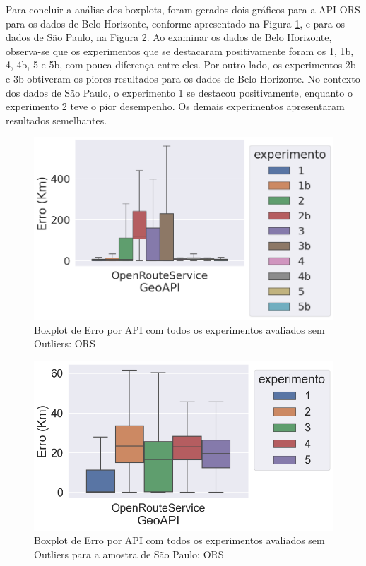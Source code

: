 Para concluir a análise dos boxplots, foram gerados dois gráficos para a API ORS para os dados de Belo Horizonte, conforme apresentado na Figura \ref{fig:boxplot-api-ors-semout-bh}, e para os dados de São Paulo, na Figura \ref{fig:boxplot-api-ors-semout-sp}. Ao examinar os dados de Belo Horizonte, observa-se que os experimentos que se destacaram positivamente foram os 1, 1b, 4, 4b, 5 e 5b, com pouca diferença entre eles. Por outro lado, os experimentos 2b e 3b obtiveram os piores resultados para os dados de Belo Horizonte. No contexto dos dados de São Paulo, o experimento 1 se destacou positivamente, enquanto o experimento 2 teve o pior desempenho. Os demais experimentos apresentaram resultados semelhantes.

\begin{figure}[h]
    \centering
    \includegraphics[width=\textwidth]{Figuras/boxplotApiOrsSemOut.png}
    \caption{Boxplot de Erro por API com todos os experimentos avaliados sem Outliers: ORS}
    \label{fig:boxplot-api-ors-semout-bh}
\end{figure}

\begin{figure}[h]
    \centering
    \includegraphics[width=\textwidth]{Figuras/boxplotApiOrsSemOutSP.png}
    \caption{Boxplot de Erro por API com todos os experimentos avaliados sem Outliers para a amostra de São Paulo: ORS}
    \label{fig:boxplot-api-ors-semout-sp}
\end{figure}

